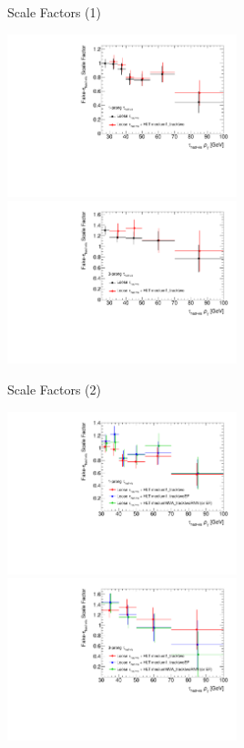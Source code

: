 \documentclass[11pt, xcolor={dvipsnames}, aspectratio=169]{beamer}
\begin{document}

\begin{frame}{Scale Factors (1)}
  \centering

  \includegraphics[width=0.5\textwidth]{ttbarSF/ttbarSF_offl_tau25_1p}%
  \includegraphics[width=0.5\textwidth]{ttbarSF/ttbarSF_offl_tau25_3p}
\end{frame}


\begin{frame}{Scale Factors (2)}
  \centering

  \includegraphics[width=0.5\textwidth]{ttbarSF/ttbarSF_tau25_1p}%
  \includegraphics[width=0.5\textwidth]{ttbarSF/ttbarSF_tau25_3p}
\end{frame}
\end{document}
